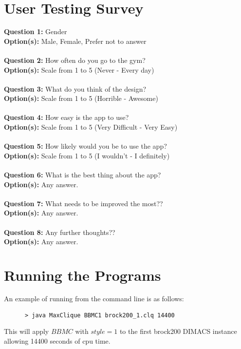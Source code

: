 \documentclass{l4proj}
\begin{document}
\begin{appendices}
\chapter{User Testing Survey}
\label{survey}
\textbf{Question 1:} Gender \\
\textbf{Option(s):}    Male, Female, Prefer not to answer
\\
\\
\textbf{Question 2:} How often do you go to the gym? \\
\textbf{Option(s):}    Scale from 1 to 5 (Never - Every day)
\\
\\
\textbf{Question 3:} What do you think of the design? \\
\textbf{Option(s):}    Scale from 1 to 5 (Horrible - Awesome)
\\
\\
\textbf{Question 4:} How easy is the app to use? \\
\textbf{Option(s):}    Scale from 1 to 5 (Very Difficult - Very Easy)
\\
\\
\textbf{Question 5:} How likely would you be to use the app? 
\\
\textbf{Option(s):}    Scale from 1 to 5 (I wouldn't - I definitely)
\\
\\
\textbf{Question 6:} What is the best thing about the app? \\
\textbf{Option(s):}     Any answer.
\\
\\
\textbf{Question 7:} What needs to be improved the most?? \\
\textbf{Option(s):}     Any answer.
\\
\\
\textbf{Question 8:} Any further thoughts?? \\
\textbf{Option(s):}     Any answer.

\chapter{Running the Programs}
An example of running from the command line is as follows:
\begin{verbatim}
      > java MaxClique BBMC1 brock200_1.clq 14400
\end{verbatim}
This will apply $BBMC$ with $style = 1$ to the first brock200 DIMACS instance allowing 14400 seconds of cpu time.


\end{appendices}
\end{document}
